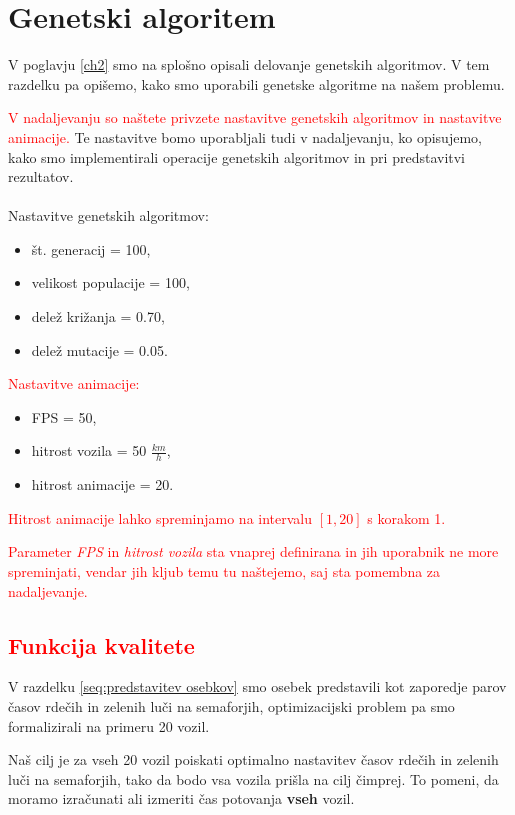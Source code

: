 \documentclass[a4paper, 12pt]{book}
\begin{document}
\section{Genetski algoritem}
\label{seq:nastavitve parametrov}
V poglavju \ref{ch2} smo na splo\v sno opisali delovanje genetskih algoritmov. V tem razdelku pa opi\v semo, kako smo uporabili genetske algoritme na na\v sem problemu.

\textcolor{red}{V nadaljevanju so na\v stete privzete nastavitve genetskih algoritmov in nastavitve animacije.} Te nastavitve bomo uporabljali tudi v nadaljevanju, ko opisujemo, kako smo implementirali operacije genetskih algoritmov in pri predstavitvi rezultatov.\\\\
Nastavitve genetskih algoritmov:
\begin{itemize}
\item \v st. generacij = 100,
\item velikost populacije = 100,
\item dele\v z kri\v zanja = 0.70,
\item dele\v z mutacije = 0.05.
\end{itemize}
\textcolor{red}{Nastavitve animacije:}
\begin{itemize}
\item FPS = 50,
\item hitrost vozila = 50 $\frac{km}{h}$,
\item hitrost animacije = 20.
\end{itemize}
\textcolor{red}{Hitrost animacije lahko spreminjamo na intervalu $[1, 20]$ s korakom 1.}

\textcolor{red}{Parameter \textit{FPS} in \textit{hitrost vozila} sta vnaprej definirana in jih uporabnik ne more spreminjati, vendar jih kljub temu tu na\v stejemo, saj sta pomembna za nadaljevanje.}

\subsection{\textcolor{red}{Funkcija kvalitete}}
V razdelku \ref{seq:predstavitev osebkov} smo osebek predstavili kot zaporedje parov \v casov rde\v cih in zelenih lu\v ci na semaforjih, optimizacijski problem pa smo formalizirali na primeru 20 vozil.

Na\v s cilj je za vseh 20 vozil poiskati optimalno nastavitev \v casov rde\v cih in zelenih lu\v ci na semaforjih, tako da bodo vsa vozila pri\v sla na cilj \v cimprej. To pomeni, da moramo izra\v cunati ali izmeriti \v cas potovanja \textbf{vseh} vozil.
\end{document}
